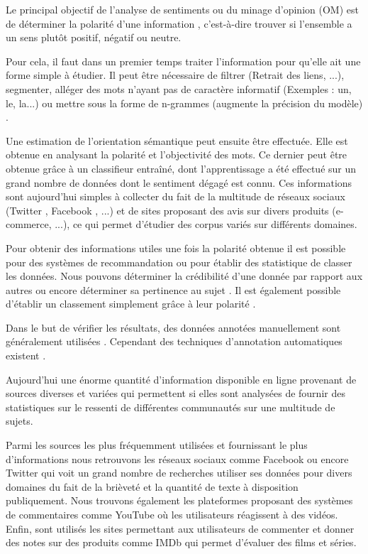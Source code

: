 \documentclass[8pt]{article}
\begin{document}
\begin{multicols}{2}
\par Le principal objectif de l’analyse de sentiments ou du minage d’opinion (OM) est de déterminer la polarité d’une information \cite{ressource6}, c’est-à-dire trouver si l’ensemble a un sens plutôt positif, négatif ou neutre.
\par Pour cela, il faut dans un premier temps traiter l’information pour qu’elle ait une forme simple à étudier. Il peut être nécessaire de filtrer (Retrait des liens, ...), segmenter, alléger des mots n’ayant pas de caractère informatif (Exemples : un, le, la...) ou mettre sous la forme de n-grammes (augmente la précision du modèle) \cite{ressource10}.
\par Une estimation de l’orientation sémantique peut ensuite être effectuée. Elle est obtenue en analysant la polarité et l’objectivité des mots. Ce dernier peut être obtenue grâce à un classifieur entraîné, dont l’apprentissage a été effectué sur un grand nombre de données dont le sentiment dégagé est connu. Ces informations sont aujourd’hui  simples à collecter \cite{ressource10} du fait de la multitude de réseaux sociaux (Twitter \cite{ressource11}, Facebook \cite{ressource27}, ...) et de sites proposant des avis sur divers produits (e-commerce, ...), ce qui permet d’étudier des corpus variés sur différents domaines.
\par Pour obtenir des informations utiles une fois la polarité obtenue il est possible pour des systèmes de recommandation ou pour établir des statistique de classer les données. Nous pouvons déterminer la crédibilité d’une donnée par rapport aux autres \cite{ressource28} ou encore déterminer sa pertinence au sujet \cite{ressource18}. Il est également possible d’établir un classement  simplement grâce à leur polarité \cite{ressource4}.
\par Dans le but de vérifier les résultats, des données annotées manuellement sont généralement utilisées \cite{ressource30}. Cependant des techniques d’annotation automatiques existent \cite{ressource19}.

\par Aujourd'hui une énorme quantité d’information disponible en ligne provenant de sources diverses et variées qui permettent si elles sont analysées de fournir des statistiques sur le ressenti de différentes communautés sur une multitude de sujets.
\par Parmi les sources les plus fréquemment utilisées et fournissant le plus d’informations nous retrouvons les réseaux sociaux comme Facebook \cite{ressource27} ou encore Twitter \cite{ressource10} \cite{ressource11} \cite{ressource14} \cite{ressource17} \cite{ressource19} \cite{ressource22} \cite{ressource23} \cite{ressource24} \cite{ressource28} qui voit un grand nombre de recherches utiliser ses données pour divers domaines du fait de la brièveté et la quantité de texte à disposition publiquement. Nous trouvons également les plateformes proposant des systèmes de commentaires comme YouTube \cite{ressource30} \cite{ressource22} où les utilisateurs réagissent à des vidéos. Enfin, sont utilisés les sites permettant aux utilisateurs de commenter et donner des notes sur des produits comme IMDb \cite{ressource1} qui permet d’évaluer des films et séries.



\end{multicols}
\end{document}
